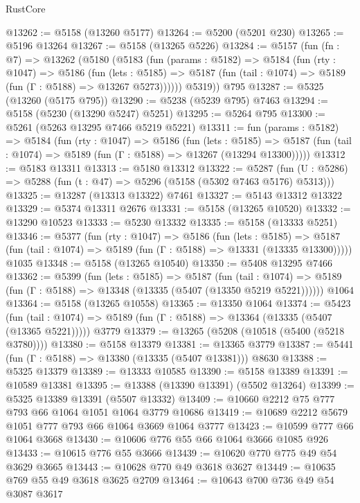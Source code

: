 \begin{lexlean}{RustCore}
\begin{coremodule}
@13262 := @5158 (@13260 @5177)
@13264 := @5200 (@5201 @230)
@13265 := @5196 @13264
@13267 := @5158 (@13265 @5226)
@13284 := @5157
    (fun (fn : @7) =>
    @13262
      (@5180
        (@5183
          (fun (params : @5182) =>
          @5184
            (fun (rty : @1047) =>
            @5186
              (fun (lets : @5185) =>
              @5187 (fun (tail : @1074) => @5189 (fun (Γ : @5188) => @13267 @5273))))))
        @5319))
    @795
@13287 := @5325 (@13260 (@5175 @795))
@13290 := @5238 (@5239 @795) @7463
@13294 := @5158 (@5230 (@13290 @5247) @5251)
@13295 := @5264 @795
@13300 := @5261 (@5263 @13295 @7466 @5219 @5221)
@13311 := fun (params : @5182) =>
  @5184
    (fun (rty : @1047) =>
    @5186
      (fun (lets : @5185) =>
      @5187 (fun (tail : @1074) => @5189 (fun (Γ : @5188) => @13267 (@13294 @13300)))))
@13312 := @5183 @13311
@13313 := @5180 @13312
@13322 := @5287
    (fun (U : @5286) => @5288 (fun (t : @47) => @5296 (@5158 (@5302 @7463 @5176) @5313)))
@13325 := @13287 (@13313 @13322) @7461
@13327 := @5143 @13312 @13322
@13329 := @5374 @13311 @2676
@13331 := @5158 (@13265 @10520)
@13332 := @13290 @10523
@13333 := @5230 @13332
@13335 := @5158 (@13333 @5251)
@13346 := @5377
    (fun (rty : @1047) =>
    @5186
      (fun (lets : @5185) =>
      @5187 (fun (tail : @1074) => @5189 (fun (Γ : @5188) => @13331 (@13335 @13300)))))
    @1035
@13348 := @5158 (@13265 @10540)
@13350 := @5408 @13295 @7466
@13362 := @5399
    (fun (lets : @5185) =>
    @5187
      (fun (tail : @1074) =>
      @5189 (fun (Γ : @5188) => @13348 (@13335 (@5407 (@13350 @5219 @5221))))))
    @1064
@13364 := @5158 (@13265 @10558)
@13365 := @13350 @1064
@13374 := @5423
    (fun (tail : @1074) => @5189 (fun (Γ : @5188) => @13364 (@13335 (@5407 (@13365 @5221)))))
    @3779
@13379 := @13265 (@5208 (@10518 (@5400 (@5218 @3780))))
@13380 := @5158 @13379
@13381 := @13365 @3779
@13387 := @5441 (fun (Γ : @5188) => @13380 (@13335 (@5407 @13381))) @8630
@13388 := @5325 @13379
@13389 := @13333 @10585
@13390 := @5158 @13389
@13391 := @10589 @13381
@13395 := @13388 (@13390 @13391) (@5502 @13264)
@13399 := @5325 @13389 @13391 (@5507 @13332)
@13409 := @10660 @2212 @75 @777 @793 @66 @1064 @1051 @1064 @3779 @10686
@13419 := @10689 @2212 @5679 @1051 @777 @793 @66 @1064 @3669 @1064 @3777
@13423 := @10599 @777 @66 @1064 @3668
@13430 := @10606 @776 @55 @66 @1064 @3666 @1085 @926
@13433 := @10615 @776 @55 @3666
@13439 := @10620 @770 @775 @49 @54 @3629 @3665
@13443 := @10628 @770 @49 @3618 @3627
@13449 := @10635 @769 @55 @49 @3618 @3625 @2709
@13464 := @10643
    @700
    @736
    @49
    @54
    @3087
    @3617

\end{coremodule}
\end{lexlean}
